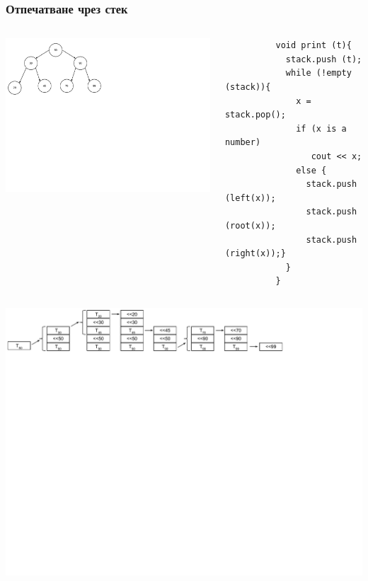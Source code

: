 \documentclass{beamer}
\begin{document}
\begin{frame}[fragile]
\frametitle{Отпечатване чрез стек}


\begin{columns}[t]
  \begin{column}{0.4\textwidth}

\includegraphics[width=11cm]{images/tree_bot_clean}
  \end{column}
  \begin{column}{0.6\textwidth}

      \begin{flushleft}
        \begin{lstlisting}
          void print (t){
            stack.push (t);
            while (!empty (stack)){
              x = stack.pop();
              if (x is a number)
                 cout << x;
              else {
                stack.push (left(x));
                stack.push (root(x));
                stack.push (right(x));}
            }
          }
        \end{lstlisting}
      \end{flushleft}

  \end{column}
\end{columns}

\vspace{-120px}
\includegraphics[width=15cm]{images/tree_print_with_stack}


\end{frame}
\end{document}
